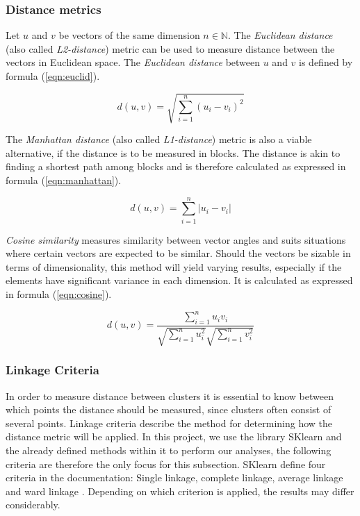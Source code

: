 \subsubsection{Distance metrics}
Let $u$ and $v$ be vectors of the same dimension $n \in \mathbb{N}$. The \textit{Euclidean distance} (also called \textit{L2-distance}) metric can be used to measure distance between the vectors in Euclidean space. The \textit{Euclidean distance} between $u$ and $v$ is defined by formula (\ref{eqn:euclid}).

\begin{equation}
\label{eqn:euclid}
d(u, v) = \sqrt{\sum_{i=1}^n (u_i - v_i)^2} 
\end{equation}

The \textit{Manhattan distance} (also called \textit{L1-distance}) metric is also a viable alternative, if the distance is to be measured in blocks. The distance is akin to finding a shortest path among blocks and is therefore calculated as expressed in formula (\ref{eqn:manhattan}).

\begin{equation}
\label{eqn:manhattan}
d(u, v) = \sum_{i=1}^n |u_i - v_i|
\end{equation}

\textit{Cosine similarity} measures similarity between vector angles and suits situations where certain vectors are expected to be similar. Should the vectors be sizable in terms of dimensionality, this method will yield varying results, especially if the elements have significant variance in each dimension. It is calculated as expressed in formula (\ref{eqn:cosine}).

\begin{equation}
\label{eqn:cosine}
d(u, v) = \frac{\sum_{i=1}^n u_iv_i}{\sqrt{\sum_{i=1}^n u_i^2}\sqrt{\sum_{i=1}^n v_i^2}}
\end{equation}

\subsubsection{Linkage Criteria}
In order to measure distance between clusters it is essential to know between which points the distance should be measured, since clusters often consist of several points. Linkage criteria describe the method for determining how the distance metric will be applied. In this project, we use the library SKlearn and the already defined methods within it to perform our analyses, the following criteria are therefore the only focus for this subsection. SKlearn define four criteria in the documentation: Single linkage, complete linkage, average linkage and ward linkage \cite{scikit}. Depending on which criterion is applied, the results may differ considerably.

